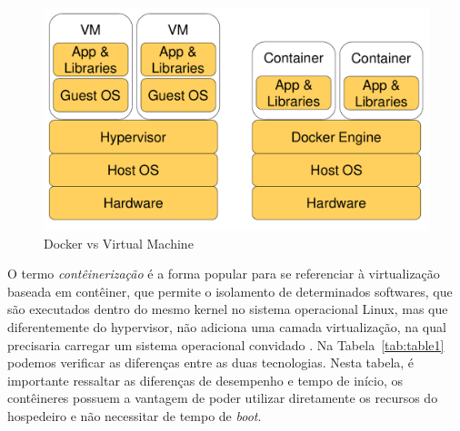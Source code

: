 \documentclass[twoside,english,brazilian]{UNISINOSartigo}
\begin{document}
\begin{figure}
	\caption{Docker vs Virtual Machine}
	\label{fig:vmvsdocker}
	\centering%
	\begin{minipage}{.4\textwidth}
		\includegraphics[width=\textwidth]{images/VMxDocker}
	\end{minipage}
\end{figure}

O termo \textit{contêinerização} é a forma popular para se referenciar à virtualização baseada em contêiner, que permite o isolamento de determinados softwares, que são executados dentro do mesmo kernel no sistema operacional Linux, mas que diferentemente do hypervisor, não adiciona uma camada virtualização, na qual precisaria carregar um sistema operacional convidado \cite{Zhang2016}.
Na Tabela~\ref{tab:table1} podemos verificar as diferenças entre as duas tecnologias. Nesta tabela, é importante ressaltar as diferenças de desempenho e tempo de início, os contêineres possuem a vantagem de poder utilizar diretamente os recursos do hospedeiro e não necessitar de tempo de \textit{boot}.
\end{document}
